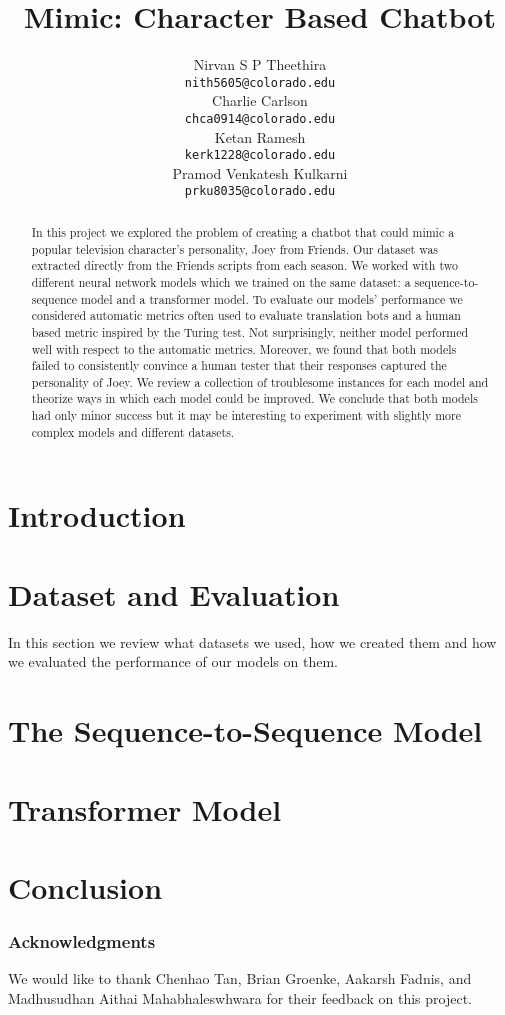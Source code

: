 \documentclass{article}
\title{Mimic: Character Based Chatbot}
\author{%
	Nirvan S P Theethira\\
	\texttt{nith5605@colorado.edu} \\
	\And
	Charlie Carlson\\
	\texttt{chca0914@colorado.edu} \\
	\And
	Ketan Ramesh\\
	\texttt{kerk1228@colorado.edu} \\
	\And
	Pramod Venkatesh Kulkarni\\
	\texttt{prku8035@colorado.edu} \\
}
\begin{document}
	
	\maketitle
	
	\begin{abstract}
		In this project we explored the problem of creating a chatbot that could mimic a popular television character's personality, Joey from Friends.
		Our dataset was extracted directly from the Friends scripts from each season. 
		We worked with two different neural network models which we trained on the same dataset: a sequence-to-sequence model and a transformer model. 
		To evaluate our models' performance we considered automatic metrics often used to evaluate translation bots and a human based metric inspired by the Turing test.
		Not surprisingly, neither model performed well with respect to the automatic metrics.
		Moreover, we found that both models failed to consistently convince a human tester that their responses captured the personality of Joey.
		We review a collection of troublesome instances for each model and theorize ways in which each model could be improved.
		We conclude that both models had only minor success but it may be interesting to experiment with slightly more complex models and different datasets. 
	\end{abstract}
	
	\section{Introduction}
	

	\section{Dataset and Evaluation}
	In this section we review what datasets we used, how we created them and how we evaluated the performance of our models on them.
	
	
	
	\section{The Sequence-to-Sequence Model}
	
	\section{Transformer Model}
	
	
	
	\section{Conclusion}
	
	\subsubsection*{Acknowledgments}
	
	We would like to thank Chenhao Tan, Brian Groenke, Aakarsh Fadnis, and Madhusudhan Aithai Mahabhaleswhwara for their feedback on this project.
	
	
	
	
\end{document}
